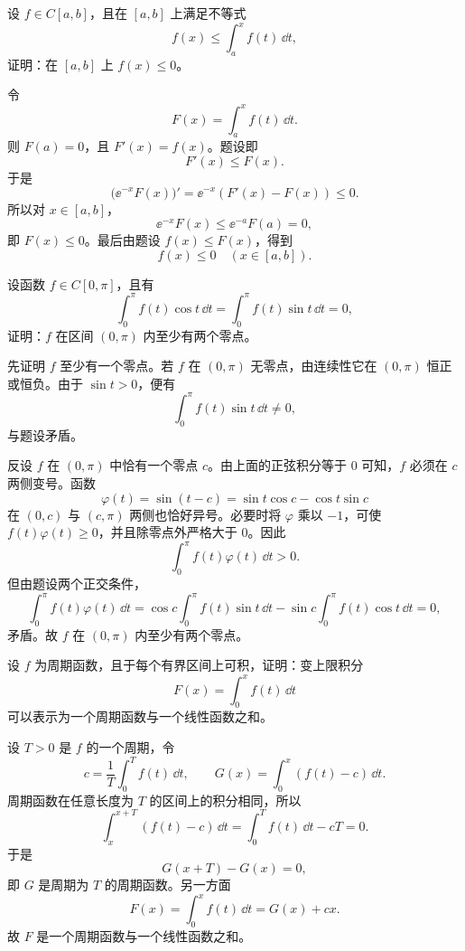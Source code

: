 \begin{xexercise}[3]
设 $f\in C[a,b]$，且在 $[a,b]$ 上满足不等式
\[
  f(x)\leqslant\int_a^x f(t)\,\dd t,
\]
证明：在 $[a,b]$ 上 $f(x)\leqslant0$。
\end{xexercise}
\begin{xsolution}
令
\[
  F(x)=\int_a^x f(t)\,\dd t.
\]
则 $F(a)=0$，且 $F'(x)=f(x)$。题设即
\[
  F'(x)\leqslant F(x).
\]
于是
\[
  \bigl(\ee^{-x}F(x)\bigr)'=\ee^{-x}(F'(x)-F(x))\leqslant0.
\]
所以对 $x\in[a,b]$，
\[
  \ee^{-x}F(x)\leqslant\ee^{-a}F(a)=0,
\]
即 $F(x)\leqslant0$。最后由题设 $f(x)\leqslant F(x)$，得到
\[
  \boxed{f(x)\leqslant0\quad(x\in[a,b])}.
\]
\end{xsolution}


\begin{xexercise}[4]
设函数 $f\in C[0,\pi]$，且有
\[
  \int_0^\pi f(t)\cos t\,\dd t=\int_0^\pi f(t)\sin t\,\dd t=0,
\]
证明：$f$ 在区间 $(0,\pi)$ 内至少有两个零点。
\end{xexercise}
\begin{xsolution}
先证明 $f$ 至少有一个零点。若 $f$ 在 $(0,\pi)$ 无零点，由连续性它在 $(0,\pi)$ 恒正或恒负。由于 $\sin t>0$，便有
\[
  \int_0^\pi f(t)\sin t\,\dd t\ne0,
\]
与题设矛盾。

反设 $f$ 在 $(0,\pi)$ 中恰有一个零点 $c$。由上面的正弦积分等于 $0$ 可知，$f$ 必须在 $c$ 两侧变号。函数
\[
  \varphi(t)=\sin(t-c)=\sin t\cos c-\cos t\sin c
\]
在 $(0,c)$ 与 $(c,\pi)$ 两侧也恰好异号。必要时将 $\varphi$ 乘以 $-1$，可使 $f(t)\varphi(t)\geqslant0$，并且除零点外严格大于 $0$。因此
\[
  \int_0^\pi f(t)\varphi(t)\,\dd t>0.
\]
但由题设两个正交条件，
\[
  \int_0^\pi f(t)\varphi(t)\,\dd t
  =\cos c\int_0^\pi f(t)\sin t\,\dd t
  -\sin c\int_0^\pi f(t)\cos t\,\dd t=0,
\]
矛盾。故 $f$ 在 $(0,\pi)$ 内至少有两个零点。
\end{xsolution}


\begin{xexercise}[5]
设 $f$ 为周期函数，且于每个有界区间上可积，证明：变上限积分
\[
  F(x)=\int_0^x f(t)\,\dd t
\]
可以表示为一个周期函数与一个线性函数之和。
\end{xexercise}
\begin{xsolution}
设 $T>0$ 是 $f$ 的一个周期，令
\[
  c=\frac1T\int_0^T f(t)\,\dd t,
  \qquad
  G(x)=\int_0^x(f(t)-c)\,\dd t.
\]
周期函数在任意长度为 $T$ 的区间上的积分相同，所以
\[
  \int_x^{x+T}(f(t)-c)\,\dd t
  =\int_0^T f(t)\,\dd t-cT=0.
\]
于是
\[
  G(x+T)-G(x)=0,
\]
即 $G$ 是周期为 $T$ 的周期函数。另一方面
\[
  F(x)=\int_0^x f(t)\,\dd t=G(x)+cx.
\]
故 $F$ 是一个周期函数与一个线性函数之和。
\end{xsolution}


